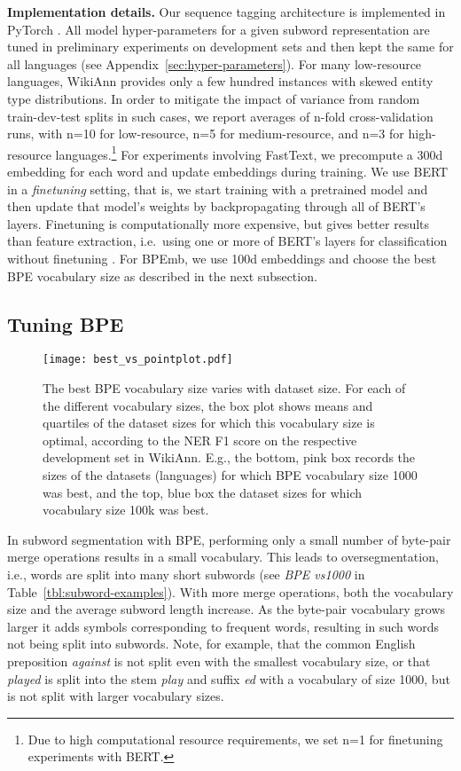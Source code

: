 \documentclass[11pt,a4paper]{article}
\begin{document}
\noindent\textbf{Implementation details.} Our sequence tagging architecture is implemented in PyTorch \citep{paszke2017pytorch}.
All model hyper-parameters for a given subword representation are tuned in preliminary experiments on development sets and then kept the same for all languages (see Appendix~\ref{sec:hyper-parameters}).
For many low-resource languages, WikiAnn provides only a few hundred instances with skewed entity type distributions.
In order to mitigate the impact of variance from random train-dev-test splits in such cases, we report averages of n-fold cross-validation runs, with n=10 for low-resource, n=5 for medium-resource, and n=3 for high-resource languages.\footnote{Due to high computational resource requirements, we set n=1 for finetuning experiments with BERT.}
For experiments involving FastText, we precompute a 300d embedding for each word and update embeddings during training.
We use BERT in a \emph{finetuning} setting, that is, we start training with a pretrained model and then update that model's weights by backpropagating through all of BERT's layers.
Finetuning is computationally more expensive, but gives better results than feature extraction, i.e.\ using one or more of BERT's layers for classification without finetuning \citep{devlin2018bert}.
For BPEmb, we use 100d embeddings and choose the best BPE vocabulary size as described in the next subsection.

\subsection{Tuning BPE}
\label{sec:tuning-bpe}
\begin{figure}
	\centering
	\texttt{[image: best\_vs\_pointplot.pdf]}
	\caption{The best BPE vocabulary size varies with dataset size. For each of the different vocabulary sizes, the box plot shows means and quartiles of the dataset sizes for which this vocabulary size is optimal, according to the NER F1 score on the respective development set in WikiAnn. E.g., the bottom, pink box records the sizes of the datasets (languages) for which BPE vocabulary size 1000 was best, and the top, blue box the dataset sizes for which vocabulary size 100k was best.}
	\label{fig:best-vocabsizes}
\end{figure}

In subword segmentation with BPE, performing only a small number of byte-pair merge operations results in a small vocabulary.
This leads to oversegmentation, i.e., words are split into many short subwords (see \emph{BPE vs1000} in Table~\ref{tbl:subword-examples}).
With more merge operations, both the vocabulary size and the average subword length increase.
As the byte-pair vocabulary grows larger it adds symbols corresponding to frequent words, resulting in such words not being split into subwords.
Note, for example, that the common English preposition \emph{against} is not split even with the smallest vocabulary size, or that \emph{played} is split into the stem \emph{play} and suffix \emph{ed} with a vocabulary of size 1000, but is not split with larger vocabulary sizes.
\end{document}
